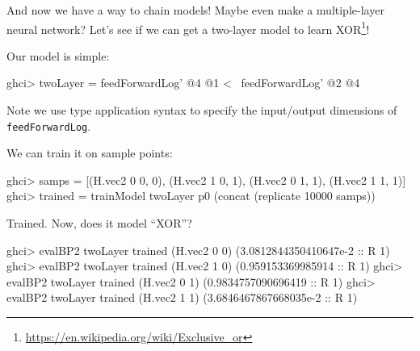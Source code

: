 \documentclass[]{article}
\newenvironment{Shaded}{}{}
\newcommand{\DataTypeTok}[1]{\textcolor[rgb]{0.56,0.13,0.00}{#1}}
\newcommand{\DecValTok}[1]{\textcolor[rgb]{0.25,0.63,0.44}{#1}}
\newcommand{\FloatTok}[1]{\textcolor[rgb]{0.25,0.63,0.44}{#1}}
\newcommand{\FunctionTok}[1]{\textcolor[rgb]{0.02,0.16,0.49}{#1}}
\newcommand{\NormalTok}[1]{#1}
\newcommand{\OtherTok}[1]{\textcolor[rgb]{0.00,0.44,0.13}{#1}}
\renewcommand{\href}[2]{#2\footnote{\url{#1}}}
\begin{document}
And now we have a way to chain models! Maybe even make a multiple-layer neural
network? Let's see if we can get a two-layer model to learn
\href{https://en.wikipedia.org/wiki/Exclusive_or}{XOR}!

Our model is simple:

\begin{Shaded}
\begin{Highlighting}[]
\NormalTok{ghci}\FunctionTok{>}\NormalTok{ twoLayer }\FunctionTok{=}\NormalTok{ feedForwardLog' }\FunctionTok{@}\DecValTok{4} \FunctionTok{@}\DecValTok{1} \FunctionTok{<~}\NormalTok{ feedForwardLog' }\FunctionTok{@}\DecValTok{2} \FunctionTok{@}\DecValTok{4}
\end{Highlighting}
\end{Shaded}

Note we use type application syntax to specify the input/output dimensions of
\texttt{feedForwardLog\textquotesingle{}}.

We can train it on sample points:

\begin{Shaded}
\begin{Highlighting}[]
\NormalTok{ghci}\FunctionTok{>}\NormalTok{ samps }\FunctionTok{=}\NormalTok{ [(H.vec2 }\DecValTok{0} \DecValTok{0}\NormalTok{, }\DecValTok{0}\NormalTok{), (H.vec2 }\DecValTok{1} \DecValTok{0}\NormalTok{, }\DecValTok{1}\NormalTok{), (H.vec2 }\DecValTok{0} \DecValTok{1}\NormalTok{, }\DecValTok{1}\NormalTok{), (H.vec2 }\DecValTok{1} \DecValTok{1}\NormalTok{, }\DecValTok{1}\NormalTok{)]}
\NormalTok{ghci}\FunctionTok{>}\NormalTok{ trained }\FunctionTok{=}\NormalTok{ trainModel twoLayer p0 (concat (replicate }\DecValTok{10000}\NormalTok{ samps))}
\end{Highlighting}
\end{Shaded}

Trained. Now, does it model ``XOR''?

\begin{Shaded}
\begin{Highlighting}[]
\NormalTok{ghci}\FunctionTok{>}\NormalTok{ evalBP2 twoLayer trained (H.vec2 }\DecValTok{0} \DecValTok{0}\NormalTok{)}
\NormalTok{(}\FloatTok{3.0812844350410647e-2}\OtherTok{ ::} \DataTypeTok{R} \DecValTok{1}\NormalTok{)}
\NormalTok{ghci}\FunctionTok{>}\NormalTok{ evalBP2 twoLayer trained (H.vec2 }\DecValTok{1} \DecValTok{0}\NormalTok{)}
\NormalTok{(}\FloatTok{0.959153369985914}\OtherTok{ ::} \DataTypeTok{R} \DecValTok{1}\NormalTok{)}
\NormalTok{ghci}\FunctionTok{>}\NormalTok{ evalBP2 twoLayer trained (H.vec2 }\DecValTok{0} \DecValTok{1}\NormalTok{)}
\NormalTok{(}\FloatTok{0.9834757090696419}\OtherTok{ ::} \DataTypeTok{R} \DecValTok{1}\NormalTok{)}
\NormalTok{ghci}\FunctionTok{>}\NormalTok{ evalBP2 twoLayer trained (H.vec2 }\DecValTok{1} \DecValTok{1}\NormalTok{)}
\NormalTok{(}\FloatTok{3.6846467867668035e-2}\OtherTok{ ::} \DataTypeTok{R} \DecValTok{1}\NormalTok{)}
\end{Highlighting}
\end{Shaded}
\end{document}
